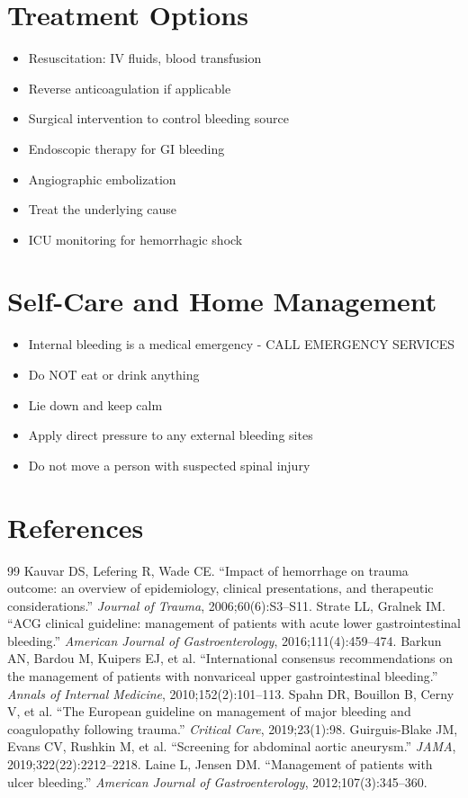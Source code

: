 \section*{Treatment Options}
\begin{itemize}
\item Resuscitation: IV fluids, blood transfusion
\item Reverse anticoagulation if applicable
\item Surgical intervention to control bleeding source
\item Endoscopic therapy for GI bleeding
\item Angiographic embolization
\item Treat the underlying cause
\item ICU monitoring for hemorrhagic shock
\end{itemize}

\section*{Self-Care and Home Management}
\begin{itemize}
\item Internal bleeding is a medical emergency - CALL EMERGENCY SERVICES
\item Do NOT eat or drink anything
\item Lie down and keep calm
\item Apply direct pressure to any external bleeding sites
\item Do not move a person with suspected spinal injury
\end{itemize}

\section*{References}
\begin{thebibliography}{99}
 Kauvar DS, Lefering R, Wade CE. ``Impact of hemorrhage on trauma outcome: an overview of epidemiology, clinical presentations, and therapeutic considerations.'' \textit{Journal of Trauma}, 2006;60(6):S3--S11.
 Strate LL, Gralnek IM. ``ACG clinical guideline: management of patients with acute lower gastrointestinal bleeding.'' \textit{American Journal of Gastroenterology}, 2016;111(4):459--474.
 Barkun AN, Bardou M, Kuipers EJ, et al. ``International consensus recommendations on the management of patients with nonvariceal upper gastrointestinal bleeding.'' \textit{Annals of Internal Medicine}, 2010;152(2):101--113.
 Spahn DR, Bouillon B, Cerny V, et al. ``The European guideline on management of major bleeding and coagulopathy following trauma.'' \textit{Critical Care}, 2019;23(1):98.
 Guirguis-Blake JM, Evans CV, Rushkin M, et al. ``Screening for abdominal aortic aneurysm.'' \textit{JAMA}, 2019;322(22):2212--2218.
 Laine L, Jensen DM. ``Management of patients with ulcer bleeding.'' \textit{American Journal of Gastroenterology}, 2012;107(3):345--360.

\end{thebibliography}
